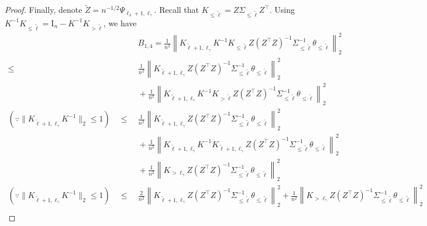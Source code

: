 \documentclass{article}
\theoremstyle{plain}
\theoremstyle{definition}
\theoremstyle{remark}
\begin{document}
\begin{appendix}
\begin{proof}
Finally, denote $\tilde{Z}=n^{-1/2}\Psi_{\ell_{\lambda}+1, \ell_{\gamma}}$. 
Recall that $K_{\leq \tilde{\ell}}=Z\Sigma_{\leq \tilde{\ell}} Z^{\top}$. 
Using $K^{-1}K_{\leq \tilde{\ell}}=\mathrm{I}_n-K^{-1}K_{>\tilde{\ell}}$, we have
\begin{equation*}
    \begin{aligned}
    &~ B_{1,4} = \frac{1}{n^2}\left\| K_{\tilde{\ell}+1, \ell_{\gamma}} K^{-1} K_{\leq \tilde{\ell}}
                Z (Z^{\top} 
                Z)^{-1} \Sigma_{\leq \tilde{\ell}}^{-1} \theta_{\leq \tilde{\ell}} \right\|_{2}^{2}\\
    \leq &~ 
    \frac{1}{n^2}\left\| K_{\tilde{\ell}+1, \ell_{\gamma}} 
                Z (Z^{\top} 
                Z)^{-1} \Sigma_{\leq \tilde{\ell}}^{-1} \theta_{\leq \tilde{\ell}} \right\|_{2}^{2}
               \\
             &~  +
                \frac{1}{n^2}\left\| K_{\tilde{\ell}+1, \ell_{\gamma}} K^{-1} K_{>\tilde{\ell}} 
                Z (Z^{\top} 
                Z)^{-1} \Sigma_{\leq \tilde{\ell}}^{-1} \theta_{\leq \tilde{\ell}} \right\|_{2}^{2}\\
              (\because  \|K_{\tilde{\ell}+1, \ell_{\gamma}} K^{-1}\|_2 \leq 1)\quad {\leq} &~
                \frac{1}{n^2}\left\| K_{\tilde{\ell}+1, \ell_{\gamma}} 
                Z (Z^{\top} 
                Z)^{-1}\Sigma_{\leq \tilde{\ell}}^{-1} \theta_{\leq \tilde{\ell}} \right\|_{2}^{2}
               \\
               &~  +
                \frac{1}{n^2}\left\| K_{\tilde{\ell}+1, \ell_{\gamma}} K^{-1} K_{\tilde{\ell}+1, \ell_{\gamma}} 
                Z (Z^{\top} 
                Z)^{-1}\Sigma_{\leq \tilde{\ell}}^{-1} \theta_{\leq \tilde{\ell}} \right\|_{2}^{2}\\
                &~+
                \frac{1}{n^2}\left\| K_{>\ell_{\gamma}} 
                Z (Z^{\top} 
                Z)^{-1}\Sigma_{\leq \tilde{\ell}}^{-1} \theta_{\leq \tilde{\ell}} \right\|_{2}^{2}\\
                (\because  \|K_{\tilde{\ell}+1, \ell_{\gamma}} K^{-1}\|_2 \leq 1)\quad {\leq} &~
                \frac{2}{n^2}\left\| K_{\tilde{\ell}+1, \ell_{\gamma}} 
                Z (Z^{\top} 
                Z)^{-1}\Sigma_{\leq \tilde{\ell}}^{-1} \theta_{\leq \tilde{\ell}} \right\|_{2}^{2}
                +
                \frac{1}{n^2}\left\| K_{>\ell_{\gamma}} 
                Z (Z^{\top} 
                Z)^{-1}\Sigma_{\leq \tilde{\ell}}^{-1} \theta_{\leq \tilde{\ell}} \right\|_{2}^{2}\\

\end{aligned}
\end{equation*}
\end{proof}
\end{appendix}
\end{document}
